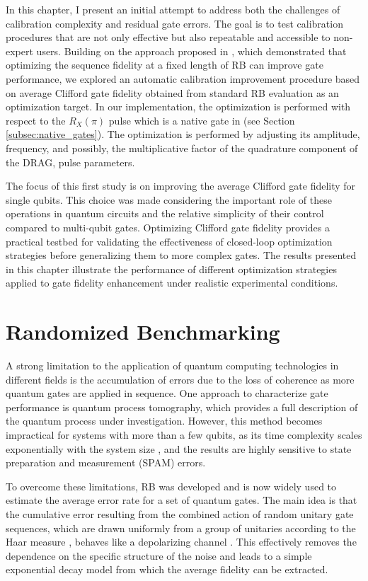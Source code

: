 In this chapter, I present an initial attempt to address both the challenges of calibration complexity and residual gate errors. 
The goal is to test calibration procedures that are not only effective but also repeatable and accessible to non-expert users.  
Building on the approach proposed in \cite{kelly_optimal_2014}, which demonstrated that optimizing the sequence fidelity at a fixed length of RB can improve gate performance, we explored an automatic calibration improvement procedure based on average Clifford gate fidelity obtained from standard RB evaluation as an optimization target.
In our implementation, the optimization is performed with respect to the $R_X(\pi)$ pulse which is a native gate in \Qibolab (see Section \ref{subsec:native_gates}).
The optimization is performed by adjusting its amplitude, frequency, and possibly, the multiplicative factor of the quadrature component of the DRAG, pulse parameters.

The focus of this first study is on improving the average Clifford gate fidelity for single qubits. 
This choice was made considering the important role of these operations in quantum circuits and the relative simplicity of their control compared to multi-qubit gates.
Optimizing Clifford gate fidelity provides a practical testbed for validating the effectiveness of closed-loop optimization strategies before generalizing them to more complex gates.
The results presented in this chapter illustrate the performance of different optimization strategies applied to gate fidelity enhancement under realistic experimental conditions.

\section{Randomized Benchmarking}\label{sec:RBsection}
A strong limitation to the application of quantum computing technologies in different fields is the accumulation of errors due to the loss of coherence as more quantum gates are applied in sequence. 
One approach to characterize gate performance is quantum process tomography, which provides a full description of the quantum process under investigation. 
However, this method becomes impractical for systems with more than a few qubits, as its time complexity scales exponentially with the system size \cite{QPTomography}, and the results are highly sensitive to state preparation and measurement (SPAM) errors.

To overcome these limitations, RB was developed and is now widely used to estimate the average error rate for a set of quantum gates. 
The main idea is that the cumulative error resulting from the combined action of random unitary gate sequences, which are drawn uniformly from a group of unitaries according to the Haar measure \cite{Mele_2024}, behaves like a depolarizing channel \cite{Emerson_2005_RB}. 
This effectively removes the dependence on the specific structure of the noise and leads to a simple exponential decay model from which the average fidelity can be extracted.

